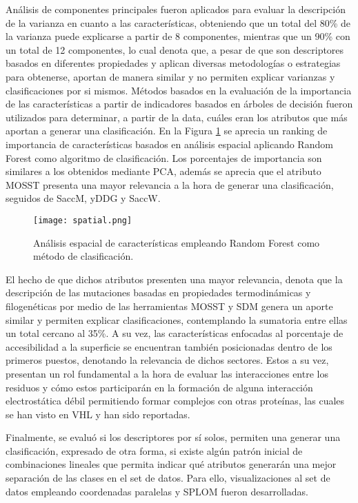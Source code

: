 Análisis de componentes principales fueron aplicados para evaluar la descripción de la varianza en cuanto a las características, obteniendo que un total del 80\% de la varianza puede explicarse a partir de 8 componentes, mientras que un 90\% con un total de 12 componentes, lo cual denota que, a pesar de que son descriptores basados en diferentes propiedades y aplican diversas metodologías o estrategias para obtenerse, aportan de manera similar y no permiten explicar varianzas y clasificaciones por si mismos. Métodos basados en la evaluación de la importancia de las características a partir de indicadores basados en árboles de decisión fueron utilizados para determinar, a partir de la data, cuáles eran los atributos que más aportan a generar una clasificación. En la Figura \ref{spatial} se aprecia un ranking de importancia de características basados en análisis espacial aplicando Random Forest como algoritmo de clasificación. Los porcentajes de importancia son similares a los obtenidos mediante PCA, además se aprecia que el atributo MOSST presenta una mayor relevancia a la hora de generar una clasificación, seguidos de SaccM, yDDG y SaccW.

\begin{figure}[!h]
	\centering
	\texttt{[image: spatial.png]}
	\caption{Análisis espacial de características empleando Random Forest como método de clasificación.}
	\label{spatial}
\end{figure}

El hecho de que dichos atributos presenten una mayor relevancia, denota que la descripción de las mutaciones basadas en propiedades termodinámicas y filogenéticas por medio de las herramientas MOSST \cite{Olivera-Nappa2011} y SDM \cite{Pandurangan2017} genera un aporte similar y permiten explicar clasificaciones, contemplando la sumatoria entre ellas un total cercano al 35\%. A su vez, las características enfocadas al porcentaje de accesibilidad a la superficie se encuentran también posicionadas dentro de los primeros puestos, denotando la relevancia de dichos sectores. Estos a su vez, presentan un rol fundamental a la hora de evaluar las interacciones entre los residuos y cómo estos participarán en la formación de alguna interacción electrostática débil permitiendo formar complejos con otras proteínas, las cuales se han visto en VHL y han sido reportadas.

Finalmente, se evaluó si los descriptores por sí solos, permiten una generar una clasificación, expresado de otra forma, si existe algún patrón inicial de combinaciones lineales que permita indicar qué atributos generarán una mejor separación de las clases en el set de datos. Para ello, visualizaciones al set de datos empleando coordenadas paralelas y SPLOM fueron desarrolladas. 

